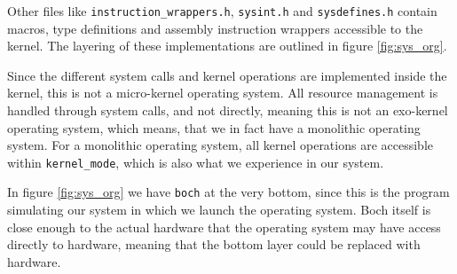 Other files like \texttt{instruction\_wrappers.h}, \texttt{sysint.h} and \texttt{sysdefines.h} contain macros, type definitions and assembly instruction wrappers accessible to the kernel. The layering of these implementations are outlined in figure \ref{fig:sys_org}.

Since the different system calls and kernel operations are implemented inside the kernel, this is not a micro-kernel operating system. All resource management is handled through system calls, and not directly, meaning this is not an exo-kernel operating system, which means, that we in fact have a monolithic operating system. For a monolithic operating system, all kernel operations are accessible within \texttt{kernel\_mode}, which is also what we experience in our system. 

In figure \ref{fig:sys_org} we have \texttt{boch} at the very bottom, since this is the program simulating our system in which we launch the operating system. Boch itself is close enough to the actual hardware that the operating system may have access directly to hardware, meaning that the bottom layer could be replaced with hardware.
